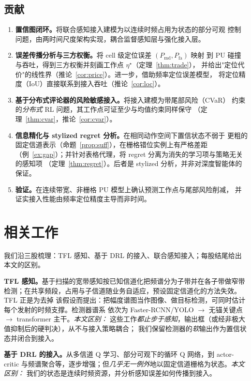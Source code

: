 \documentclass[11pt,a4paper]{article}
\newcommand{\hei}[1]{{\cjkhei #1}}
\theoremstyle{plain}
\theoremstyle{definition}
\newcommand{\Pmd}{P_{\mathrm{md}}}
\newcommand{\Pfa}{P_{\mathrm{fa}}}
\newcommand{\thr}{\eta}
\begin{document}
\subsection{贡献}
\begin{enumerate}[leftmargin=*]
\item \textbf{\hei{置信图闭环。}}将联合感知接入建模为以连续时频占用为状态的部分可观
控制问题，由两时间尺度架构实现，耦合监督感知层与强化接入层。
\item \textbf{\hei{误差传播分析与三方权衡。}}将 cell 级定位误差 $(\Pmd,\Pfa)$ 映射
到 PU 碰撞与吞吐，得到三方权衡并刻画工作点 $\thr^\star$（定理~\ref{thm:trade}），
并给出"定位代价"的线性界（推论~\ref{cor:price}）。进一步，借助频率定位误差模型，
将定位精度（IoU）直接联系到接入吞吐（推论~\ref{cor:loc}）。
\item \textbf{\hei{基于分布式评论器的风险敏感接入。}}将接入建模为带尾部风险（CVaR）
约束的\emph{分布式} RL 问题，其工作点可证至少与均值约束同样保守
（定理~\ref{thm:cvar}，推论~\ref{cor:cvar}）。
\item \textbf{\hei{信息精化与 stylized regret 分析。}}在相同动作空间下置信状态不弱于
更粗的固定信道表示（命题~\ref{prop:suff}），在栅格错位实例上有严格差距
（例~\ref{ex:gap}）；并针对表格代理，将 regret 分离为消失的学习项与策略无关的感知项
（定理~\ref{thm:regret}）。后者是 stylized 分析，并非对深度智能体的保证。
\item \textbf{\hei{验证。}}在连续带宽、非栅格 PU 模型上确认预测工作点与尾部风险削减，
并证实接入性能由频率定位精度主导而非时间。
\end{enumerate}

\section{相关工作}
我们沿三股梳理：TFL 感知、基于 DRL 的接入、联合感知接入；每股结尾给出本文的区别。

\textbf{\hei{TFL 感知。}}基于扫描的宽带感知按已知信道化把频谱分为子带并在各子带做窄带
检测；在共享频段，占用与子信道随业务自适应，预设固定信道化的方法失效。TFL 正是为去掉
该假设而提出：把幅度谱图当作图像、做目标检测，可同时估计每个发射的时频支撑。检测器谱系
依次为 Faster-RCNN/YOLO $\to$ 无锚关键点 $\to$ transformer 主干。\emph{本文区别：}
这些工作\emph{都止步于感知}，输出框（或经非极大值抑制后的硬判决），从不与接入策略耦合；
我们保留检测器的\emph{软}输出作为置信状态并闭合到接入。

\textbf{\hei{基于 DRL 的接入。}}从多信道 Q 学习、部分可观下的循环 Q 网络，到 actor-critic
与频谱聚合等，逐步增强；但\emph{几乎无一例外}地以固定信道栅格为状态。\emph{本文区别：}
我们的状态是连续时频资源，并分析感知误差如何传播到接入。
\end{document}
